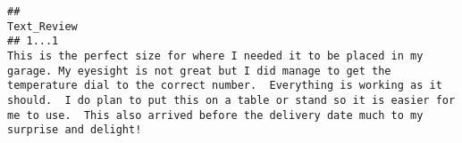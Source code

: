 \documentclass[
  11pt,
]{article}
\begin{document}
\begin{verbatim}
##                                                                                                                                                                                                                                                                                                                                                                                                                                                                                                                                                                                                                                                                                                                                                                                                                                                                                                                                                                                                                                                                                                                                                                                                                                                                                                                                                                                                                                                                                Text_Review
## 1...1                                                                                                                                                                                                                                                                                                                                                                                                                                                                                                                                                                                                                                                                                                                                                                                                                                                                                                                                                                                                                                                                                                                   This is the perfect size for where I needed it to be placed in my garage. My eyesight is not great but I did manage to get the temperature dial to the correct number.  Everything is working as it should.  I do plan to put this on a table or stand so it is easier for me to use.  This also arrived before the delivery date much to my surprise and delight!

\end{verbatim}
\end{document}
